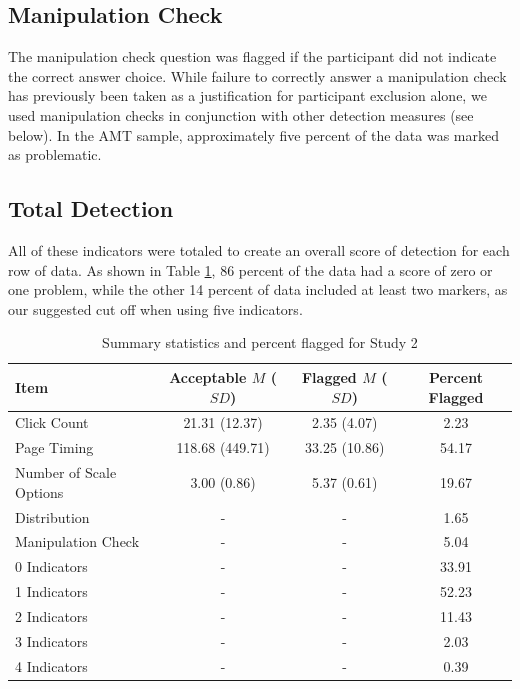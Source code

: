 \documentclass[english,man]{apa6}
\theoremstyle{definition}
\theoremstyle{definition}
\theoremstyle{definition}
\theoremstyle{remark}
\begin{document}
\subsection{Manipulation Check}\label{manipulation-check}

The manipulation check question was flagged if the participant did not
indicate the correct answer choice. While failure to correctly answer a
manipulation check has previously been taken as a justification for
participant exclusion alone, we used manipulation checks in conjunction
with other detection measures (see below). In the AMT sample,
approximately five percent of the data was marked as problematic.

\subsection{Total Detection}\label{total-detection-1}

All of these indicators were totaled to create an overall score of
detection for each row of data. As shown in Table \ref{tab:amt-table1},
86 percent of the data had a score of zero or one problem, while the
other 14 percent of data included at least two markers, as our suggested
cut off when using five indicators.

\begin{table}[tbp]
\begin{center}
\begin{threeparttable}
\caption{\label{tab:amt-table1}Summary statistics and percent flagged for Study 2}
\begin{tabular}{lccc}
\toprule
Item & \multicolumn{1}{c}{Acceptable $M$ ($SD$)} & \multicolumn{1}{c}{Flagged $M$ ($SD$)} & \multicolumn{1}{c}{Percent Flagged}\\
\midrule
Click Count & 21.31 (12.37) & 2.35 (4.07) & 2.23\\
Page Timing & 118.68 (449.71) & 33.25 (10.86) & 54.17\\
Number of Scale Options & 3.00 (0.86) & 5.37 (0.61) & 19.67\\
Distribution & - & - & 1.65\\
Manipulation Check & - & - & 5.04\\
0 Indicators & - & - & 33.91\\
1 Indicators & - & - & 52.23\\
2 Indicators & - & - & 11.43\\
3 Indicators & - & - & 2.03\\
4 Indicators & - & - & 0.39\\
\bottomrule
\end{tabular}
\end{threeparttable}
\end{center}
\end{table}
\end{document}
